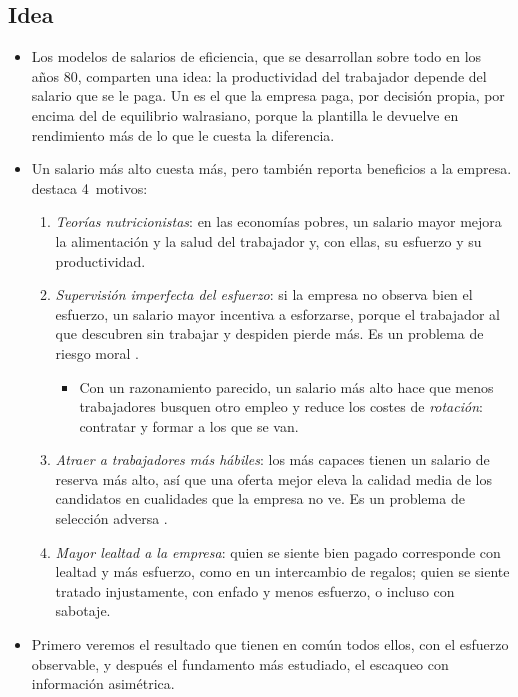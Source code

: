 \documentclass[11pt]{article}
\begin{document}
\subsection{Idea}\label{sec:eficiencia-idea}

\begin{itemize}
\item Los modelos de salarios de eficiencia, que se desarrollan sobre todo en los años 80\nocite{AkerlofYellen1986Efficiency}, comparten una idea: la productividad del trabajador depende del salario que se le paga. Un  es el que la empresa paga, por decisión propia, por encima del de equilibrio walrasiano, porque la plantilla le devuelve en rendimiento más de lo que le cuesta la diferencia.
\item Un salario más alto cuesta más, pero también reporta beneficios a la empresa. \textcite[cap.~11]{Romer2019Advanced} destaca 4~motivos:
  \begin{enumerate}
  \item \emph{Teorías nutricionistas}\nocite{Leibenstein1957Theory}: en las economías pobres, un salario mayor mejora la alimentación y la salud del trabajador y, con ellas, su esfuerzo y su productividad.
  \item \emph{Supervisión imperfecta del esfuerzo}\nocite{ShapiroStiglitz1984Equilibrium}: si la empresa no observa bien el esfuerzo, un salario mayor incentiva a esforzarse, porque el trabajador al que descubren sin trabajar y despiden pierde más. Es un problema de riesgo moral .
    \begin{itemize}
    \item Con un razonamiento parecido, un salario más alto hace que menos trabajadores busquen otro empleo y reduce los costes de \emph{rotación}: contratar y formar a los que se van\nocite{Stiglitz1974Alternative,Salop1979Model}.
    \end{itemize}
  \item \emph{Atraer a trabajadores más hábiles}\nocite{Weiss1980Job}: los más capaces tienen un salario de reserva más alto, así que una oferta mejor eleva la calidad media de los candidatos en cualidades que la empresa no ve. Es un problema de selección adversa .
  \item \emph{Mayor lealtad a la empresa}\nocite{Akerlof1982Labor,AkerlofYellen1990Fair}: quien se siente bien pagado corresponde con lealtad y más esfuerzo, como en un intercambio de regalos; quien se siente tratado injustamente, con enfado y menos esfuerzo, o incluso con sabotaje.
  \end{enumerate}
\item Primero veremos el resultado que tienen en común todos ellos, con el esfuerzo observable\nocite{Solow1979Another}, y después el fundamento más estudiado, el escaqueo con información asimétrica\nocite{ShapiroStiglitz1984Equilibrium}.
\end{itemize}
\end{document}
